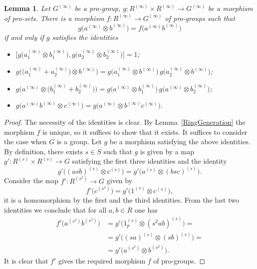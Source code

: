 \documentclass{article}
\newtheorem{lemma}{Lemma}
\newcommand{\rar}{\rightarrow}
\begin{document}
\begin{lemma}\label{RingPresentation}
Let \(G^{(\infty)}\) be a pro-group, \(g \colon R^{(\infty)} \times R^{(\infty)} \rar G^{(\infty)}\) be a morphism of pro-sets. There is a morphism \(f \colon R^{(\infty)} \rar G^{(\infty)}\) of pro-groups such that
\[g\bigl(a^{(\infty)} \otimes b^{(\infty)}\bigr) = f\bigl(a^{(\infty)} b^{(\infty)}\bigr)\]
if and only if \(g\) satisfies the identities
\begin{itemize}
\item \(\bigl[g\bigl(a_1^{(\infty)} \otimes b_1^{(\infty)}\bigr), g\bigl(a_2^{(\infty)} \otimes b_2^{(\infty)}\bigr)\bigr] = 1\);
\item \(g\bigl(\bigl(a_1^{(\infty)} + a_2^{(\infty)}\bigr) \otimes b^{(\infty)}\bigr) = g\bigl(a_1^{(\infty)} \otimes b^{(\infty)}\bigr)\, g\bigl(a_2^{(\infty)} \otimes b^{(\infty)}\bigr)\);
\item \(g\bigl(a^{(\infty)} \otimes \bigl(b_1^{(\infty)} + b_2^{(\infty)}\bigr)\bigr) = g\bigl(a^{(\infty)} \otimes b_1^{(\infty)}\bigr)\, g\bigl(a^{(\infty)} \otimes b_2^{(\infty)}\bigr)\);
\item \(g\bigl(a^{(\infty)} b^{(\infty)} \otimes c^{(\infty)}\bigr) = g\bigl(a^{(\infty)} \otimes b^{(\infty)} c^{(\infty)}\bigr)\).
\end{itemize}
\end{lemma}
\begin{proof}
The necessity of the identities is clear.
By Lemma~\ref{RingGeneration} the morphism \(f\) is unique, so it suffices to show that it exists.
It suffices to consider the case when \(G\) is a group. 
Let \(g\) be a morphism satisfying the above identities.
By definition, there exists $s\in S$ such that $g$ is given by a map \(g' \colon R^{(s)} \times R^{(s)} \rar G\) satisfying the first three identities and the identity 
\[g'\bigl((asb)^{(s)} \otimes c^{(s)}\bigr) = g'\bigl(a^{(s)} \otimes (bsc)^{(s)}\bigr).\]
Consider the map \(f' \colon R^{(s^2)} \rar G\) given by
\[f'\bigl(c^{(s^2)}\bigr) = g'\bigl(1^{(s)} \otimes c^{(s)}\bigr),\]
it is a homomorphism by the first and the third identities.
From the last two identities we conclude that for all \(a, b \in R\) one has
\begin{align*}
f'\bigl(a^{(s^2)} b^{(s^2)})
&= g' \bigl( 1^{(s)}_p \otimes (s^2 ab)^{(s)} \bigr) =\\
&= g' \bigl( (sa)^{(s)} \otimes (sb)^{(s)} \bigr) =\\
&= g' \bigl(a^{(s^2)} \otimes b^{(s^2)}\bigr).
\end{align*}
It is clear that \(f'\) gives the required morphism \(f\) of pro-groups.
\end{proof}

\printbibliography
\end{document}

